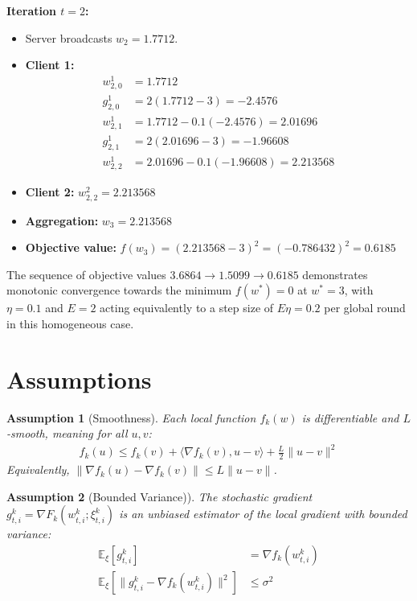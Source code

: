 \documentclass{article}
\newtheorem{assumption}{Assumption}
\begin{document}
\textbf{Iteration $t=2$:}
\begin{itemize}
    \item Server broadcasts $w_2 = 1.7712$.
    \item \textbf{Client 1:}
    \begin{align*}
        w_{2,0}^1 &= 1.7712 \\
        g_{2,0}^1 &= 2(1.7712 - 3) = -2.4576 \\
        w_{2,1}^1 &= 1.7712 - 0.1(-2.4576) = 2.01696 \\
        g_{2,1}^1 &= 2(2.01696 - 3) = -1.96608 \\
        w_{2,2}^1 &= 2.01696 - 0.1(-1.96608) = 2.213568
    \end{align*}
    \item \textbf{Client 2:} $w_{2,2}^2 = 2.213568$
    \item \textbf{Aggregation:} $w_3 = 2.213568$
    \item \textbf{Objective value:} $f(w_3) = (2.213568 - 3)^2 = (-0.786432)^2 = 0.6185$
\end{itemize}
The sequence of objective values $3.6864 \to 1.5099 \to 0.6185$ demonstrates monotonic convergence towards the minimum $f(w^*) = 0$ at $w^* = 3$, with $\eta=0.1$ and $E=2$ acting equivalently to a step size of $E\eta = 0.2$ per global round in this homogeneous case.

\section*{Assumptions}
\begin{assumption}[Smoothness]
Each local function $f_k(w)$ is differentiable and $L$-smooth, meaning for all $u, v$:
\begin{align*}
    f_k(u) \leq f_k(v) + \langle \nabla f_k(v), u - v \rangle + \frac{L}{2} \|u - v\|^2
\end{align*}
Equivalently, $\|\nabla f_k(u) - \nabla f_k(v)\| \leq L \|u - v\|$.
\end{assumption}

\begin{assumption}[Bounded Variance)]
The stochastic gradient $g_{t,i}^k = \nabla F_k(w_{t,i}^k; \xi_{t,i}^k)$ is an unbiased estimator of the local gradient with bounded variance:
\begin{align*}
    \mathbb{E}_{\xi}[g_{t,i}^k] &= \nabla f_k(w_{t,i}^k) \\
    \mathbb{E}_{\xi}[\|g_{t,i}^k - \nabla f_k(w_{t,i}^k)\|^2] &\leq \sigma^2
\end{align*}
\end{assumption}
\end{document}
